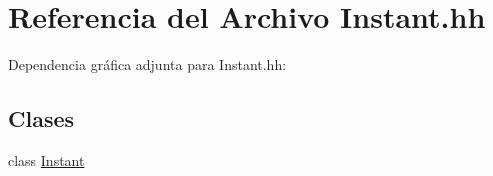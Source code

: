 \hypertarget{_instant_8hh}{\section{Referencia del Archivo Instant.\-hh}
\label{_instant_8hh}
}
Dependencia gráfica adjunta para Instant.\-hh\-:
\subsection*{Clases}
\begin{DoxyCompactItemize}
\item 
class \hyperlink{class_instant}{Instant}
\end{DoxyCompactItemize}
